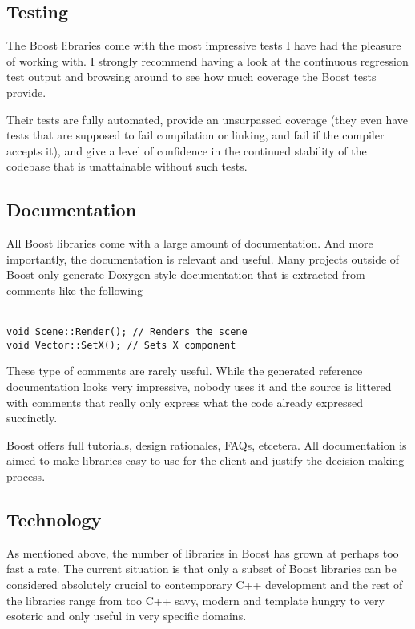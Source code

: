 \documentclass[twocolumn]{paper}
\begin{document}
\subsection{Testing}

The Boost libraries come with the most impressive tests I have had
the pleasure of working with. I strongly recommend having a look at
the continuous regression test output \cite{bib:regression output}
and browsing around to see how much coverage the Boost tests
provide.

Their tests are fully automated, provide an unsurpassed coverage
(they even have tests that are supposed to fail compilation or
linking, and fail if the compiler accepts it), and give a level of
confidence in the continued stability of the codebase that is
unattainable without such tests.

\subsection{Documentation}

All Boost libraries come with a large amount of documentation. And
more importantly, the documentation is relevant and useful. Many
projects outside of Boost only generate Doxygen-style documentation
that is extracted from comments like the following

\texttt{\\
void Scene::Render(); // Renders the scene \\
void Vector::SetX(); // Sets X component}

These type of comments are rarely useful. While the generated
reference documentation looks very impressive, nobody uses it and
the source is littered with comments that really only express what
the code already expressed succinctly.

Boost offers full tutorials, design rationales, FAQs, etcetera. All
documentation is aimed to make libraries easy to use for the client
and justify the decision making process.

\subsection{Technology}

As mentioned above, the number of libraries in Boost has grown at
perhaps too fast a rate. The current situation is that only a subset
of Boost libraries can be considered absolutely crucial to
contemporary C++ development and the rest of the libraries range
from too C++ savy, modern and template hungry to very esoteric and
only useful in very specific domains.
\end{document}
